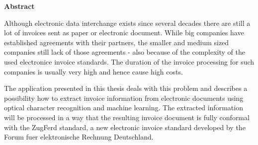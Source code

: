 \documentclass[english,mt]{lmedoc}
\begin{document}
\vspace{5.0cm}

\begin{center}
\bfseries
Abstract
\normalfont

Although electronic data interchange exists since several decades there are still a lot of invoices sent as paper or electronic document. While big companies have established agreements with their partners, the smaller and medium sized companies still lack of those agreements - also because of the complexity of the used electronice invoice standards.
The duration of the invoice processing for such companies is usually very high and hence cause high costs.

The application presented in this thesis deals with this problem and describes a possibility how to extract invoice information from electronic documents using optical character recognition and machine learning. The extracted information will be processed in a way that the resulting invoice document is fully conformal with the ZugFerd standard, a new electronic invoice standard developed by the Forum fuer elektronische Rechnung Deutschland. 
\end{center}

\cleardoublepage

\tableofcontents

\cleardoublepage {}
\end{document}
